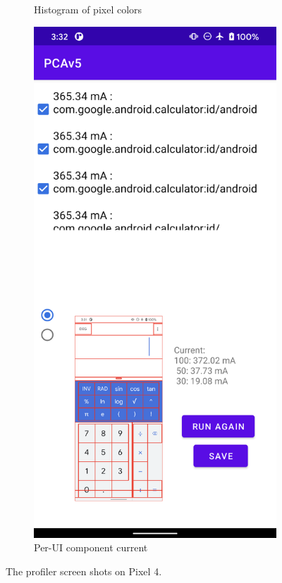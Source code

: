 \begin{figure}[tp]
\begin{subfigure}[]{0.30\columnwidth}
		\caption{Histogram of pixel colors}
		\label{fig:tool1_screenshot_d}
	\end{subfigure}
        \hfill 
	\begin{subfigure}[]{0.30\columnwidth}
		\includegraphics[width=\textwidth]{figure/002_app_break_down.png}
		\caption{Per-UI component current}
		\label{fig:tool1_screenshot_c}
	\end{subfigure}
        \vspace{-0.1in}
	\caption{The \name profiler screen shots on Pixel 4.}
	\label{fig:tool1_screenshot}
    \vspace{-0.2in}
\end{figure}
